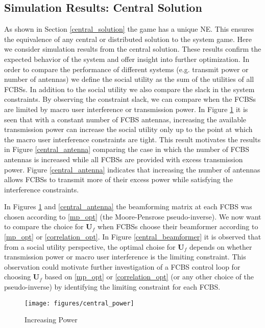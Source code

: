 \subsection{Simulation Results: Central Solution}
As shown in Section \ref{central_solution} the game has a unique NE. This ensures the equivalence of any central or distributed solution to the system game. Here we consider simulation results from the central solution. These results confirm the expected behavior of the system and offer insight into further optimization. In order to compare the performance of different systems (e.g. transmit power or number of antennas) we define the social utility as the sum of the utilities of all FCBSs. In addition to the social utility we also compare the slack in the system constraints. By observing the constraint slack, we can compare when the FCBSs are limited by macro user interference or transmission power. 
In Figure \ref{central_power} it is seen that with a constant number of FCBS antennas, increasing the available transmission power can increase the social utility only up to the point at which the macro user interference constraints are tight. This result motivates the results in Figure \ref{central_antenna} comparing the case in which the number of FCBS antennas is increased while all FCBSs are provided with excess transmission power. Figure \ref{central_antenna} indicates that increasing the number of antennas allows FCBSs to transmit more of their excess power while satisfying the interference constraints. 
\par
In Figures \ref{central_power} and \ref{central_antenna} the beamforming matrix at each FCBS was chosen according to \ref{mp_opt} (the Moore-Pensrose pseudo-inverse). We now want to compare the choice for $\mathbf{U}_f$ when FCBSs choose their beamformer according to  \eqref{mp_opt} or \eqref{correlation_opt}. In Figure \ref{central_beamformer} it is observed that from a social utility perspective, the optimal choise for $\mathbf{U}_f$ depends on whether transmission power or macro user interference is the limiting constraint. This observation could motivate further investigation of a FCBS control loop for choosing $\mathbf{U}_f$ based on \eqref{mp_opt} or \eqref{correlation_opt} (or any other choice of the pseudo-inverse) by identifying the limiting constraint for each FCBS. 

\begin{figure}[H]
	\texttt{[image: figures/central\_power]}
	  \caption{Increasing Power}
	  \label{central_power}
\end{figure}

